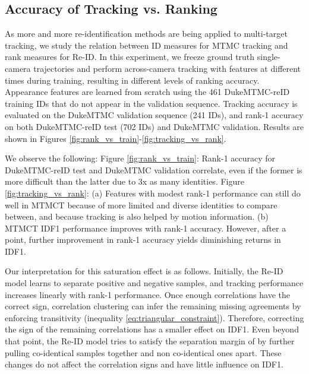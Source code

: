 \documentclass[10pt,twocolumn,letterpaper]{article}
\begin{document}
\subsection{Accuracy of Tracking vs. Ranking}

As more and more re-identification methods are being applied to multi-target tracking, we study the relation between ID measures for MTMC tracking and rank measures for Re-ID. In this experiment, we freeze ground truth single-camera trajectories and perform across-camera tracking with features at different times during training, resulting in different levels of ranking accuracy. Appearance features are learned from scratch using the 461 DukeMTMC-reID training IDs that do not appear in the validation sequence. Tracking accuracy is evaluated on the DukeMTMC validation sequence (241 IDs), and rank-1 accuracy on both DukeMTMC-reID test (702 IDs) and DukeMTMC validation. Results are shown in Figures \ref{fig:rank_vs_train}-\ref{fig:tracking_vs_rank}. 




We observe the following: Figure \ref{fig:rank_vs_train}: Rank-1 accuracy for DukeMTMC-reID test and DukeMTMC validation correlate, even if the former is more difficult than the latter due to 3x as many identities. Figure \ref{fig:tracking_vs_rank}: (a) Features with modest rank-1 performance can still do well in MTMCT because of more limited and diverse identities to compare between, and because tracking is also helped by motion information. (b) MTMCT IDF1 performance improves with rank-1 accuracy. However, after a point, further improvement in rank-1 accuracy yields diminishing returns in IDF1.

Our interpretation for this saturation effect is as follows. Initially, the Re-ID model learns to separate positive and negative samples, and tracking performance increases linearly with rank-1 performance. Once enough correlations have the correct sign, correlation clustering can infer the remaining missing agreements by enforcing transitivity (inequality \ref{eq:triangular_constraint}). Therefore, correcting the sign of the remaining correlations has a smaller effect on IDF1. Even beyond that point, the Re-ID model tries to satisfy the separation margin of  by further pulling co-identical samples together and non co-identical ones apart. These changes do not affect the correlation signs and have little influence on IDF1.
\end{document}
